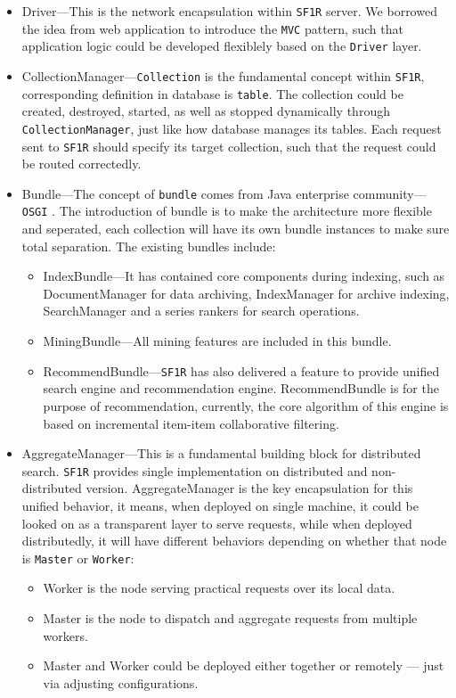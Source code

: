 \begin{itemize}
 \item Driver---This is the network encapsulation within \texttt{SF1R} server. We borrowed the idea from web application to introduce the \texttt{MVC} pattern, such that application
 logic could be developed flexiblely based on the \texttt{Driver} layer.
 \item CollectionManager---\texttt{Collection} is the fundamental concept within \texttt{SF1R}, corresponding definition in database is \texttt{table}. The collection could be created,
 destroyed, started, as well as stopped dynamically through \texttt{CollectionManager}, just like how database manages its tables. Each request sent to \texttt{SF1R} should specify its
 target collection, such that the request could be routed correctedly.
 \item Bundle---The concept of \texttt{bundle} comes from Java enterprise community---\texttt{OSGI} \cite{osgi}. The introduction of bundle is to make the architecture more flexible and
 seperated, each collection will have its own bundle instances to make sure total separation. The existing bundles include:
  \begin{itemize}
   \item IndexBundle---It has contained core components during indexing, such as DocumentManager for data archiving, IndexManager for archive indexing,
   SearchManager and a series rankers for search operations.
   \item MiningBundle---All mining features are included in this bundle.
   \item RecommendBundle---\texttt{SF1R} has also delivered a feature to provide unified search engine and recommendation engine. RecommendBundle is for the purpose of recommendation,
   currently, the core algorithm of this engine is based on incremental item-item collaborative filtering.
  \end{itemize}
 \item AggregateManager---This is a fundamental building block for distributed search. \texttt{SF1R} provides single implementation on distributed and non-distributed version. AggregateManager
 is the key encapsulation for this unified behavior, it means, when deployed on single machine, it could be looked on as a transparent layer to serve requests, while when deployed 
 distributedly, it will have different behaviors depending on whether that node is \texttt{Master} or \texttt{Worker}:
  \begin{itemize}
   \item Worker is the node serving practical requests over its local data.
   \item Master is the node to dispatch and aggregate requests from multiple workers.
   \item Master and Worker could be deployed either together or remotely --- just via adjusting configurations.
  \end{itemize}

\end{itemize}

